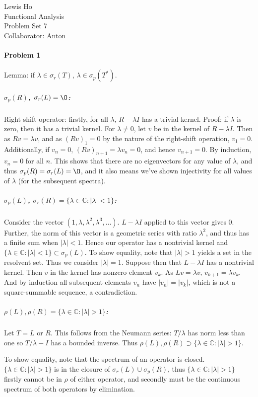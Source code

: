\documentclass[12pt]{article}
\newcommand{\s}{\sigma}
\renewcommand{\l}{\lambda}
\newcommand{\C}{\mathbb{C}}
\begin{document}
\begin{center}
  Lewis Ho\\
  Functional Analysis\\
  Problem Set 7\\
  Collaborator: Anton
\end{center}

\paragraph{Problem 1}
Lemma: if $\l \in \s_r(T)$, $\l \in \s_p(T^*)$.

\subparagraph{$\s_p(R)$, $\s_r(L) = \O$:}
Right shift operator: firstly, for all $\l$, $R-\l I$ has a trivial kernel.
Proof: if $\l$ is zero, then it has a trivial kernel. For $\l \neq 0$, 
let $v$ be in the kernel of $R-\l I$. Then as $Rv = \l v$, and as $(Rv)_1 =
0$ by the nature of the right-shift operation, $v_1 = 0$. Additionally, if
$v_n = 0$, $(Rv)_{n+1} = \lambda v_n = 0$, and hence $v_{n+1} = 0$. By induction,
$v_n = 0$ for all $n$. This shows that there are no eigenvectors for any value
of $\l$, and thus $\s_p(R) = \s_r(L) = \O$, and it also means we've shown
injectivity for all values of $\l$ (for the subsequent spectra).

\subparagraph{$\s_p(L)$, $\s_r(R) = \{\l\in\C: |\l |<1\}$:}
Consider the vector $(1, \l, \l^2, \l^3, \ldots)$. $L - \l I$ applied to this
vector gives 0. Further, the norm of this vector is a geometric series with
ratio $\l^2$, and thus has a finite sum when $|\l|<1$. Hence our operator has
a nontrivial kernel and $\{\l\in\C: |\l |<1\} \subset \s_p(L)$. To show equality,
note that $|\l|> 1$ yields a set in the resolvent set. Thus we consider $|\l| = 1
$. Suppose then that $L-\l I$ has a nontrivial kernel. Then $v$ in the kernel
has nonzero element $v_k$. As $Lv = \l v$, $v_{k+1} = \l v_k$. And by induction
all subsequent elements $v_n$ have $|v_n| = |v_k|$, which is not a square-summable
sequence, a contradiction.



\subparagraph{$\rho(L), \rho(R) = \{\l\in\C: |\l|>1\}$:}

Let $T = L$ or $R$. This follows from the
Neumann series: $T/\l$ has norm less than one so $T/\l - I$ has a bounded inverse.
Thus $\rho(L), \rho(R) \supset \{\l\in\C: |\l|>1\}$.

To show equality, note that the spectrum of an operator is closed. $\{\l\in\C:
|\l|>1\}$ is in the closure of $\s_r(L) \cup \s_p(R)$, thus $\{\l\in\C: |\l
|>1\}$ firstly cannot be in $\rho$ of either operator, and secondly must be the
continuous spectrum of both operators by elimination.
\end{document}

